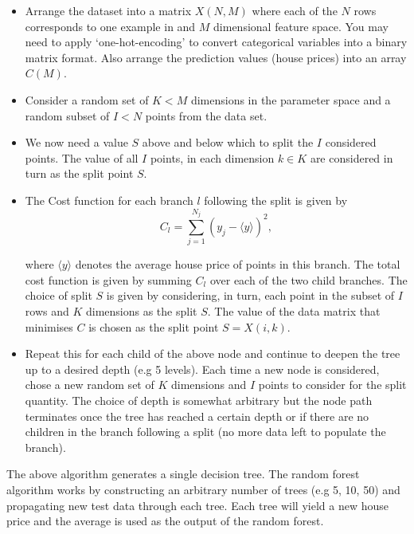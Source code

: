 \documentclass[10pt]{article}
\begin{document}
\begin{itemize}
\item Arrange the dataset into a matrix $X(N,M)$ where each of the $N$ rows corresponds to one example in and $M$ dimensional feature space. You may need to apply `one-hot-encoding' to convert categorical variables into a binary matrix format. Also arrange the prediction values (house prices) into an array $C(M)$.


\item Consider a random set of $K < M$ dimensions in the parameter space and a random subset of $I<N$ points from the data set. 

\item We now need a value $S$ above and below which to split the $I$ considered points. The value of all $I$ points, in each dimension $k \in K$ are considered in turn as the split point $S$.

\item The Cost function for each branch $l$ following the split is given by
\begin{equation}
C_l = \sum_{j=1}^{N_j} \left( y_j - \langle y \rangle \right)^2,
\end{equation}

\noindent where $\langle y \rangle$ denotes the average house price of points in this branch. The total cost function is given by summing $C_l$ over each of the two child branches. The choice of split $S$ is given by considering, in turn, each point in the subset of $I$ rows and $K$ dimensions as the split $S$. The value of the data matrix that minimises $C$ is chosen as the split point $S = X(i,k)$.


\item Repeat this for each child of the above node and continue to deepen the tree up to a desired depth (e.g 5 levels). Each time a new node is considered, chose a new random set of $K$ dimensions and $I$ points to consider for the split quantity. The choice of depth is somewhat arbitrary but the node path terminates once the tree has reached a certain depth or if there are no children in the branch following a split (no more data left to populate the branch).

\end{itemize}

The above algorithm generates a single decision tree. The random forest algorithm works by constructing an arbitrary number of trees (e.g 5, 10, 50) and propagating new test data through each tree. Each tree will yield a new house price and the average is used as the output of the random forest. 
\end{document}
